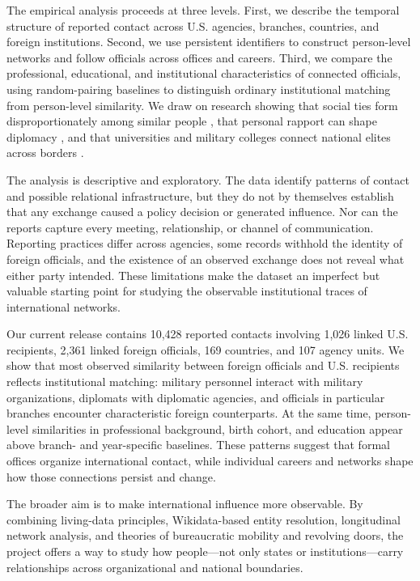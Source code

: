 \documentclass[11pt]{article}
\begin{document}
The empirical analysis proceeds at three levels. First, we describe the temporal structure of reported contact across U.S. agencies, branches, countries, and foreign institutions. Second, we use persistent identifiers to construct person-level networks and follow officials across offices and careers. Third, we compare the professional, educational, and institutional characteristics of connected officials, using random-pairing baselines to distinguish ordinary institutional matching from person-level similarity. We draw on research showing that social ties form disproportionately among similar people \citep{mcpherson2001birds}, that personal rapport can shape diplomacy \citep{holmes2013force}, and that universities and military colleges connect national elites across borders \citep{atkinson2010soft,ruby2010pme,gift2017who}.

The analysis is descriptive and exploratory. The data identify patterns of contact and possible relational infrastructure, but they do not by themselves establish that any exchange caused a policy decision or generated influence. Nor can the reports capture every meeting, relationship, or channel of communication. Reporting practices differ across agencies, some records withhold the identity of foreign officials, and the existence of an observed exchange does not reveal what either party intended. These limitations make the dataset an imperfect but valuable starting point for studying the observable institutional traces of international networks.

Our current release contains 10,428 reported contacts involving 1,026 linked U.S. recipients, 2,361 linked foreign officials, 169 countries, and 107 agency units. We show that most observed similarity between foreign officials and U.S. recipients reflects institutional matching: military personnel interact with military organizations, diplomats with diplomatic agencies, and officials in particular branches encounter characteristic foreign counterparts. At the same time, person-level similarities in professional background, birth cohort, and education appear above branch- and year-specific baselines. These patterns suggest that formal offices organize international contact, while individual careers and networks shape how those connections persist and change.

The broader aim is to make international influence more observable. By combining living-data principles, Wikidata-based entity resolution, longitudinal network analysis, and theories of bureaucratic mobility and revolving doors, the project offers a way to study how people—not only states or institutions—carry relationships across organizational and national boundaries.
\end{document}
